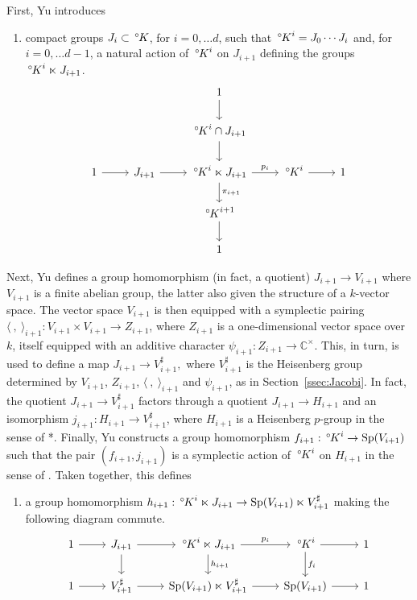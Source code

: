 \documentclass[10pt]{amsart}
\makeatletter
\theoremstyle{plain}
\theoremstyle{definition}
\newcommand{\CC}{{\mathbb{C}}}
\newcommand{\Fq}{k}
\newcommand{\labitem}[2]{
\def\@itemlabel{\textbf{#1}}
\item
\def\@currentlabel{#1}\label{#2}}
\newcommand{\Sp}{{\operatorname{Sp}}}
\newcommand{\oK}{{\,^\circ \hskip-1pt K}}
\makeatother
\begin{document}
First, Yu introduces 
\begin{enumerate}
\labitem{Y3}{Y3}
compact groups $J_i\subset \oK$, for $i=0, \ldots d$, such that 
$
\oK^i = J_0\cdots J_{i}
$ 
and, for $i=0, \ldots d-1$, a natural action of $\oK^i$ on $J_{i+1}$ defining the groups $\oK^i \ltimes J_{i+1}$.
\begin{equation}\label{eq:semiprod}
\begin{tikzcd}
\ && 1 \arrow{d} && \\
\ && \oK^{i}\cap J_{i+1}\arrow{d} && \\
1 \arrow{r} & J_{i+1} \arrow{r} & \oK^i \ltimes J_{i+1} \arrow{d}{\pi_{i+1}} \arrow{r}{p_i} & \oK^i \arrow{r} & 1\\
&& \oK^{i+1} \arrow{d}{} && \\
&& 1 &&
\end{tikzcd}
\end{equation}
\end{enumerate}
%
Next, Yu defines a group homomorphism (in fact, a quotient) 
$
J_{i+1} \to V_{i+1}
$
where $V_{i+1}$ is a finite abelian group, the latter also given the structure of a $\Fq$-vector space.
The vector space $V_{i+1}$ is then equipped with a symplectic pairing $\langle\ ,\ \rangle_{i+1} : V_{i+1}\times V_{i+1} \to Z_{i+1}$, where $Z_{i+1}$ is a one-dimensional vector space over $\Fq$, itself equipped with an additive character $\psi_{i+1} : Z_{i+1} \to \CC^\times$.
This, in turn, is used to define a map
$
J_{i+1} \to V_{i+1}^\sharp,
$
where $V_{i+1}^\sharp$ is the Heisenberg group determined by $V_{i+1}$, $Z_{i+1}$, $\langle\ ,\ \rangle_{i+1}$ and $\psi_{i+1}$, as in Section~\ref{ssec:Jacobi}.
In fact, the quotient $J_{i+1} \to V_{i+1}^\sharp$ factors through a quotient $J_{i+1} \to H_{i+1}$ and an isomorphism $j_{i+1} : H_{i+1} \to V_{i+1}^\sharp$, where $H_{i+1}$ is a Heisenberg $p$-group in the sense of \cite{yu:01a}*{}.
Finally, Yu constructs a group homomorphism $f_{i+1} : \oK^i \to \Sp(V_{i+1})$ such that the pair $(f_{i+1}, j_{i+1})$ is a symplectic action of $\oK^i$ on $H_{i+1}$ in the sense of \cite{yu:01a}.
%
Taken together, this defines
\begin{enumerate}
\labitem{Y4}{Y4}  
a group homomorphism $h_{i+1} : \oK^i \ltimes J_{i+1} \to  \Sp(V_{i+1})\ltimes V_{i+1}^\sharp$ making the following diagram commute.
\[
\begin{tikzcd}
1 \arrow{r} & J_{i+1} \arrow{d} \arrow{r} & \oK^i \ltimes J_{i+1} \arrow{d}{h_{i+1}} \arrow{r}{p_i} & \oK^i \arrow{r} \arrow{d}{f_i} & 1\\ 
1 \arrow{r} & V_{i+1}^\sharp \arrow{r} & \Sp(V_{i+1}) \ltimes V_{i+1}^\sharp \arrow{r} & \Sp(V_{i+1}) \arrow{r} & 1
\end{tikzcd}
\]
\end{enumerate}
\end{document}
